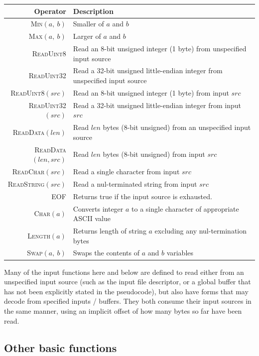 \documentclass[a4paper]{article}
\begin{document}
\begin{tabular}{rl}
\hline
\textbf{Operator} & \textbf{Description}\\
\hline
\textsc{Min}$(a,\ b)$ & Smaller of $a$ and $b$\\
\textsc{Max}$(a,\ b)$ & Larger of $a$ and $b$\\
\textsc{ReadUint8} & Read an 8-bit unsigned integer (1 byte) from unspecified input source\\
\textsc{ReadUint32} & Read a 32-bit unsigned little-endian integer from unspecified input source\\
\textsc{ReadUint8}$(src)$ & Read an 8-bit unsigned integer (1 byte) from input $src$\\
\textsc{ReadUint32}$(src)$ & Read a 32-bit unsigned little-endian integer from input $src$\\
\textsc{ReadData}$(len)$ & Read $len$ bytes (8-bit unsigned) from an unspecified input source\\
\textsc{ReadData}$(len, src)$ & Read $len$ bytes (8-bit unsigned) from input $src$\\
\textsc{ReadChar}$(src)$ & Read a single character from input $src$\\
\textsc{ReadString}$(src)$ & Read a nul-terminated string from input $src$\\
\textsc{EOF} & Returns true if the input source is exhausted.\\
\textsc{Char}$(a)$ & Converts integer $a$ to a single character of appropriate ASCII value\\
\textsc{Length}$(a)$ & Returns length of string $a$ excluding any nul-termination bytes\\
\textsc{Swap}$(a,\ b)$ & Swaps the contents of $a$ and $b$ variables\\
\hline
\end{tabular}

Many of the input functions here and below are defined to read either
from an unspecified input source (such as the input file descriptor,
or a global buffer that has not been explicitly stated in the
pseudocode), but also have forms that may decode from specified inputs
/ buffers.  They both consume their input sources in the same manner,
using an implicit offset of how many bytes so far have been read.

\subsection{Other basic functions}
\end{document}
